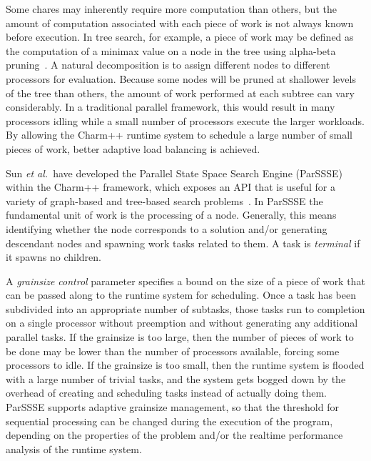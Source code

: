 \documentclass[times, 10pt,twocolumn]{article}
\newcommand{\etal}{{\em et al.}\ }
\begin{document}
Some chares may inherently require more computation than others, but the amount
of computation associated with each piece of work is not always known before
execution.  In tree search, for example, a piece of work may be defined as the
computation of a minimax value on a node in the tree using alpha-beta
pruning~\cite{knuth75analysis,baudet78analysis}.  A natural decomposition is to
assign different nodes to different processors for evaluation.  Because some
nodes will be pruned at shallower levels of the tree than others, the amount of
work performed at each subtree can vary considerably.  In a traditional
parallel framework, this would result in many processors idling while a small
number of processors execute the larger workloads. By allowing the {\sc
Charm++} runtime system to schedule a large number of small pieces of work,
better adaptive load balancing is achieved. 

Sun \etal have developed the Parallel State Space Search Engine ({\sc ParSSSE})
within the {\sc Charm++} framework, which exposes an API that is useful for a
variety of graph-based and tree-based search problems~\cite{sun11adaptive}. In
{\sc ParSSSE} the fundamental unit of work is the processing of a node.
Generally, this means identifying whether the node corresponds to a solution
and/or generating descendant nodes and spawning work tasks related to them. A
task is {\em terminal} if it spawns no children. 

A {\em grainsize control} parameter specifies a bound on the size of a piece of
work that can be passed along to the runtime system for scheduling.  Once a
task has been subdivided into an appropriate number of subtasks, those tasks
run to completion on a single processor without preemption and without generating
any additional parallel tasks.  If the grainsize is too large, then the number
of pieces of work to be done may be lower than the number of processors
available, forcing some processors to idle.  If the grainsize is too small,
then the runtime system is flooded with a large number of trivial tasks, and
the system gets bogged down by the overhead of creating and scheduling tasks
instead of actually doing them.  {\sc ParSSSE} supports adaptive grainsize
management, so that the threshold for sequential processing can be changed
during the execution of the program, depending on the properties of the problem
and/or the realtime performance analysis of the runtime system.
\end{document}

